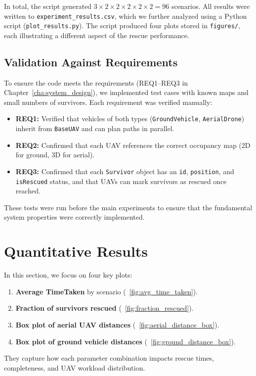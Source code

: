 \documentclass[12pt,a4paper]{report}
\begin{document}
In total, the script generated $3 \times 2 \times 2 \times 2 \times 2 \times 2 = 96$
scenarios. All results were written to \texttt{experiment\_results.csv}, which we further
analyzed using a Python script (\texttt{plot\_results.py}). The script produced four
plots stored in \texttt{figures/}, each illustrating a different aspect of the rescue
performance.

\subsection*{Validation Against Requirements}
To ensure the code meets the requirements (REQ1–REQ3 in Chapter~\ref{cha:system_design}), 
we implemented test cases with known maps and small numbers of survivors. Each 
requirement was verified manually:
\begin{itemize}
    \item \textbf{REQ1:} Verified that vehicles of both types (\texttt{GroundVehicle}, 
          \texttt{AerialDrone}) inherit from \texttt{BaseUAV} and can plan paths in parallel.
    \item \textbf{REQ2:} Confirmed that each UAV references the correct occupancy map 
          (2D for ground, 3D for aerial).
    \item \textbf{REQ3:} Confirmed that each \texttt{Survivor} object has an \texttt{id}, 
          \texttt{position}, and \texttt{isRescued} status, and that UAVs can mark 
          survivors as rescued once reached.
\end{itemize}
These tests were run before the main experiments to ensure that the fundamental 
system properties were correctly implemented.

\section{Quantitative Results}
\label{sec:quantitative_results}

In this section, we focus on four key plots: 
\begin{enumerate}
    \item \textbf{Average TimeTaken} by scenario (\figurename~\ref{fig:avg_time_taken}).
    \item \textbf{Fraction of survivors rescued} (\figurename~\ref{fig:fraction_rescued}).
    \item \textbf{Box plot of aerial UAV distances} (\figurename~\ref{fig:aerial_distance_box}).
    \item \textbf{Box plot of ground vehicle distances} (\figurename~\ref{fig:ground_distance_box}).
\end{enumerate}
They capture how each parameter combination impacts rescue times, completeness,
and UAV workload distribution.
\end{document}

